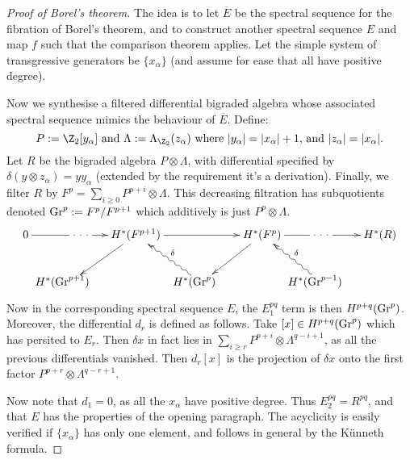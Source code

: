 \documentclass[11pt]{article}
\newcommand{\Gr}{\textup{Gr}}
\theoremstyle{plain}
\theoremstyle{definition}
\begin{document}
\begin{proof}[Proof of Borel's theorem]
\newcommand{\shrt}[1]{\makebox[0cm]{\ensuremath{#1}}}
The idea is to let $\overline E$ be the spectral sequence for the fibration of Borel's theorem, and to construct another spectral sequence $E$ and map $f$ such that the comparison theorem applies. Let the simple system of transgressive generators be $\{x_\alpha\}$ (and assume for ease that all have positive degree).

Now we synthesise a filtered differential bigraded algebra whose associated spectral sequence mimics the behaviour of $\overline E$. Define:
\[P:=\Z_2[y_\alpha]\text{ and }\Lambda:=\Lambda_{\Z_2}(z_\alpha)\text{ where $|y_\alpha|=|x_\alpha|+1$, and $|z_\alpha|=|x_\alpha|.$}\]
Let $R$ be the bigraded algebra $P\otimes\Lambda$, with differential specified by $\delta(y\otimes z_\alpha)=yy_\alpha$ (extended by the requirement it's a derivation). Finally, we filter $R$ by $F^p=\sum_{i\geq 0}P^{p+i}\otimes\Lambda$. This decreasing filtration has subquotients denoted $\Gr^p:=F^p/F^{p+1}$ which additively is just $P^p\otimes\Lambda$.
\[\xymatrix{
0\ar[rr]|{\ \cdot\ \cdot\ \cdot\ }&&H^*(F^{p+1})\ar[rr] \ar[ld]&&H^*(F^{p})\ar[ld]
\ar[rr]|{\ \cdot\ \cdot\ \cdot\ }&&H^*(R)\\
&
\shrt{H^*(\Gr^{p+1})}\phantom{{5\choose3}}&&
\shrt{H^*(\Gr^{p})}\phantom{{5\choose3}}\ar@{~>}[lu]_\delta&&
\shrt{H^*(\Gr^{p-1})}\phantom{{5\choose3}}\ar@{~>}[lu]_\delta
}\]
Now in the corresponding spectral sequence $E$, the $E_1^{pq}$ term is then $H^{p+q}(\Gr^p)$. Moreover, the differential $d_r$ is defined as follows. Take $[x]\in H^{p+q}(\Gr^p)$ which has persited to $E_r$. Then $\delta x$  in fact lies in $\sum_{i\geq r}P^{p+i}\otimes \Lambda^{q-i+1}$, as all the previous differentials vanished. Then $d_r[x]$ is the projection of $\delta x$ onto the first factor $P^{p+r}\otimes \Lambda^{q-r+1}$.

Now note that $d_1=0$, as all the $x_\alpha$ have positive degree. Thus $E_2^{pq}=R^{pq}$, and that $E$ has the properties of the opening paragraph. The acyclicity is easily verified if $\{x_\alpha\}$ has only one element, and follows in general by the K\"unneth formula.


\end{proof}
\end{document}
